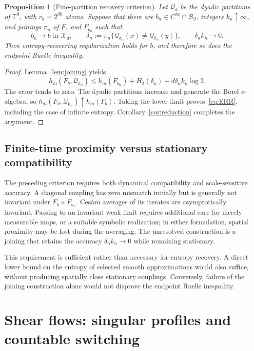 \documentclass[review,12pt,times,a4paper,nopreprintline]{elsarticle}
\theoremstyle{plain}
\newtheorem{proposition}[theorem]{Proposition}
\theoremstyle{definition}
\theoremstyle{remark}
\newcommand{\T}{\mathbb T}
\newcommand{\B}{\mathscr B}
\newcommand{\X}{\mathscr X}
\newcommand{\QQ}{\mathcal Q}
\numberwithin{equation}{section}
\begin{document}
\begin{proposition}[Fine-partition recovery criterion]\label{prop:joinrec}
Let $\QQ_k$ be the dyadic partitions of $\T^d$, with $r_k=2^{dk}$ atoms. Suppose that there are $b_n\in C^\infty\cap\B_d$, integers $k_n\uparrow\infty$, and joinings $\pi_n$ of $F_b$ and $F_{b_n}$ such that
\[
 b_n\to b\text{ in }\X_d,\qquad
 \delta_n:=\pi_n\{\QQ_{k_n}(x)\ne\QQ_{k_n}(y)\},\qquad
 \delta_n k_n\longrightarrow0.
\]
Then entropy-recovering regularization holds for $b$, and therefore so does the endpoint Ruelle inequality.
\end{proposition}
\begin{proof}
Lemma~\ref{lem:joining} yields
\[
 h_m(F_b,\QQ_{k_n})
 \leq h_m(F_{b_n})+H_2(\delta_n)+d\delta_n k_n\log2.
\]
The error tends to zero. The dyadic partitions increase and generate the Borel $\sigma$-algebra, so $h_m(F_b,\QQ_{k_n})\uparrow h_m(F_b)$. Taking the lower limit proves~\eqref{eq:ERR}, including the case of infinite entropy. Corollary~\ref{cor:reduction} completes the argument.
\end{proof}

\subsection{Finite-time proximity versus stationary compatibility}
The preceding criterion requires both dynamical compatibility and scale-sensitive accuracy. A diagonal coupling has zero mismatch initially but is generally not invariant under $F_b\times F_{b_n}$. Ces\`aro averages of its iterates are asymptotically invariant. Passing to an invariant weak limit requires additional care for merely measurable maps, or a suitable symbolic realization; in either formulation, spatial proximity may be lost during the averaging. The unresolved construction is a joining that retains the accuracy $\delta_n k_n\to0$ while remaining stationary.

This requirement is sufficient rather than necessary for entropy recovery. A direct lower bound on the entropy of selected smooth approximations would also suffice, without producing spatially close stationary couplings. Conversely, failure of the joining construction alone would not disprove the endpoint Ruelle inequality.

\section{Shear flows: singular profiles and countable switching}\label{sec:shears}
\end{document}
